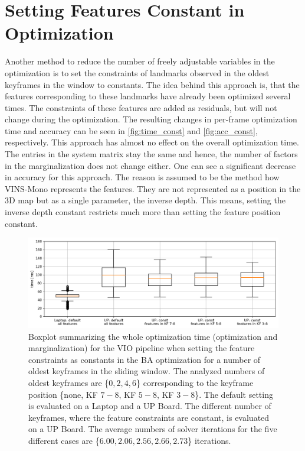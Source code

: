 \section{Setting Features Constant in Optimization} \label{sec:constFeatures}
Another method to reduce the number of freely adjustable variables in the 
optimization is to set the constraints of landmarks observed in the oldest 
keyframes in the window to constants. The idea behind this approach is, that 
the features corresponding to these landmarks have already been optimized 
several times. The constraints of these features are added as residuals, but 
will not change during the optimization. 
The resulting changes in per-frame optimization time and accuracy can be seen 
in \autoref{fig:time_const} and \autoref{fig:acc_const}, respectively. This 
approach has almost no effect on the overall optimization time. The entries in 
the system matrix stay the same and hence, the number of factors in the 
marginalization does not change either. One can see a significant decrease in 
accuracy for this approach. The reason is assumed to be the method how VINS-Mono 
represents the features. They are not represented as a position in the 3D map 
but as a single parameter, the inverse depth. This means, setting the inverse 
depth constant restricts much more than setting the feature position constant.
\begin{figure}[H]
\centering
\includegraphics[width=1\textwidth]{images/time_const}
\caption{Boxplot summarizing the whole optimization time (optimization and 
marginalization) for the \ac{VIO} pipeline when setting the feature constraints 
as constants in the \ac{BA} optimization for a number of oldest keyframes in the 
sliding window. The analyzed numbers of oldest keyframes are \{$0, 2, 4, 6$\} 
corresponding to the keyframe position \{none, KF $7\!-\!8$, KF $5\!-\!8$, KF 
$3\!-\!8$\}. The default setting is evaluated on a Laptop and a UP Board. The 
different number of keyframes, where the feature constraints are constant, is 
evaluated on a UP Board. The average numbers of solver iterations for the five 
different cases are \{$6.00, 2.06, 2.56, 2.66, 2.73$\} iterations.}
\label{fig:time_const}
\end{figure}
